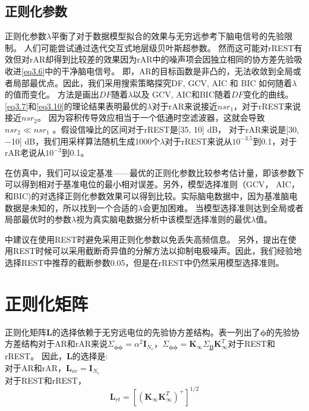 \subsection{正则化参数}
正则化参数$\lambda$平衡了对于数据模型拟合的效果与无穷远参考下脑电信号的先验限制。 
人们可能尝试通过迭代交互式地层级贝叶斯超参数。 然而这可能对rREST有效但对rAR却得到比较差的效果因为rAR中的噪声项会因独立相同的协方差先验吸收进\eqref{eq3.6}中的干净脑电信号。 即，AR的目标函数是非凸的，无法收敛到全局或者局部最优点。因此，我们采用搜索策略探究DF, GCV, AIC 和
BIC 如何随着$\lambda$的值而变化。 方法是画出$DF$随着$\lambda$以及 GCV, AIC和BIC随着$DF$变化的曲线。\eqref{eq3.7}和\eqref{eq3.10}的理论结果表明最优的$\lambda$对于rAR来说接近$nsr_1$，对于rREST来说接近$nsr_2$。 因为容积传导效应相当于一个低通时空滤波器，这就会导致$nsr_2\ll{nsr_1}$
。假设信噪比的区间对于rREST是[35, 10] dB， 对于rAR来说是[30, −10] dB，我们用采样算法随机生成1000个$\lambda$对于rREST来说从$10^{-3.5}$到0.1，对于rAR老说从$10^{-3}$到0.1。

在仿真中，我们可以设定基准——最优的正则化参数比较参考估计量，即该参数下可以得到相对于基准电位的最小相对误差。另外，模型选择准则（GCV，
AIC，和BIC)的对选择正则化参数效果可以得到比较。实际脑电数据中，因为基准脑电数据是未知的，所以找到一个合适的$\lambda$会更加困难。 当模型选择准则达到全局或者局部最优时的参数$\lambda$视为真实脑电数据分析中该模型选择准则的最优$\lambda$值。

\cite{yao_method_2001}中建议在使用REST时避免采用正则化参数以免丢失高频信息。 另外，\cite{zhai_y_and_yao_d_study_2004}提出在使用REST时候可以采用截断奇异值的分解方法以抑制电极噪声。因此，我们经验地选择REST中推荐的截断参数0.05，但是在rREST中仍然采用模型选择准则。
\section{正则化矩阵}
正则化矩阵$\mathbf{L}$的选择依赖于无穷远电位的先验协方差结构。表一列出了$\mathbf{\phi}$的先验协方差结构对于AR和rAR来说$\Sigma_{\mathbf{\phi\phi}}=\alpha^{2}\mathbf{I}_{N_e}$，$\Sigma_{\mathbf{\phi\phi}}=\mathbf{K}_{\infty}\Sigma_{\mathbf{jj}}\mathbf{K}_{\infty}^T$对于REST和rREST。 因此，$\mathbf{L}$的选择是:\\
对于AR和rAR，$\mathbf{L}_{ar}=\mathbf{I}_{N_e}$\\
对于REST和rREST，
\begin{equation}\label{eq3.17}
\mathbf{L}_{rt}=[(\mathbf{K}_\infty\mathbf{K}_\infty^T)^+]^{1/2}
\end{equation}

